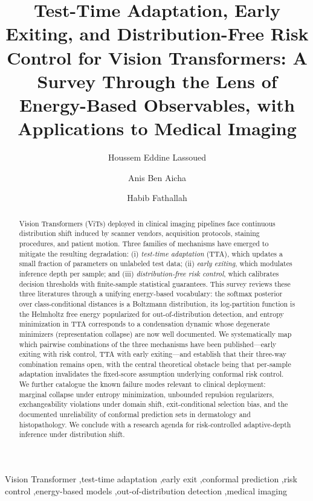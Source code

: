 \documentclass[preprint,12pt]{elsarticle}
\begin{document}
\begin{frontmatter}

\title{Test-Time Adaptation, Early Exiting, and Distribution-Free Risk Control for Vision Transformers: A Survey Through the Lens of Energy-Based Observables, with Applications to Medical Imaging}

\author[1]{Houssem Eddine Lassoued}
\author[1]{Anis Ben Aicha}
\author[1]{Habib Fathallah}

\begin{abstract}
Vision Transformers (ViTs) deployed in clinical imaging pipelines face continuous distribution shift induced by scanner vendors, acquisition protocols, staining procedures, and patient motion. Three families of mechanisms have emerged to mitigate the resulting degradation: (i) \emph{test-time adaptation} (TTA), which updates a small fraction of parameters on unlabeled test data; (ii) \emph{early exiting}, which modulates inference depth per sample; and (iii) \emph{distribution-free risk control}, which calibrates decision thresholds with finite-sample statistical guarantees. This survey reviews these three literatures through a unifying energy-based vocabulary: the softmax posterior over class-conditional distances is a Boltzmann distribution, its log-partition function is the Helmholtz free energy popularized for out-of-distribution detection, and entropy minimization in TTA corresponds to a condensation dynamic whose degenerate minimizers (representation collapse) are now well documented. We systematically map which pairwise combinations of the three mechanisms have been published---early exiting with risk control, TTA with early exiting---and establish that their three-way combination remains open, with the central theoretical obstacle being that per-sample adaptation invalidates the fixed-score assumption underlying conformal risk control. We further catalogue the known failure modes relevant to clinical deployment: marginal collapse under entropy minimization, unbounded repulsion regularizers, exchangeability violations under domain shift, exit-conditional selection bias, and the documented unreliability of conformal prediction sets in dermatology and histopathology. We conclude with a research agenda for risk-controlled adaptive-depth inference under distribution shift.
\end{abstract}

\begin{keyword}
Vision Transformer \sep test-time adaptation \sep early exit \sep conformal prediction \sep risk control \sep energy-based models \sep out-of-distribution detection \sep medical imaging
\end{keyword}

\end{frontmatter}
\end{document}
